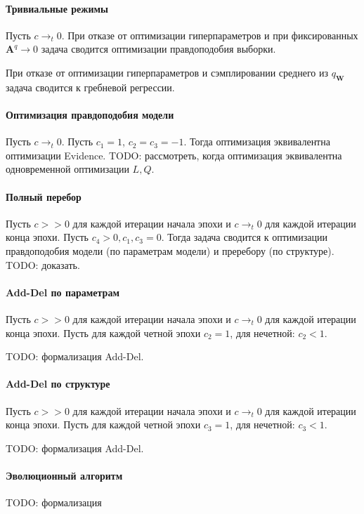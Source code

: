 \documentclass[12pt]{article}
\begin{document}
\paragraph{Тривиальные режимы}
Пусть $c \to_t 0.$
При отказе от оптимизации гиперпараметров и при фиксированных $\mathbf{A}^q \to 0$ задача сводится оптимизации правдоподобия выборки. 

При отказе от оптимизации гиперпараметров и сэмплировании среднего из $q_\mathbf{W}$ задача сводится к гребневой регрессии.

\paragraph{Оптимизация правдоподобия модели}
Пусть $c \to_t 0.$
Пусть $c_1 = 1$, $c_2 = c_3 = -1$. Тогда оптимизация эквивалентна оптимизации Evidence. 
TODO: рассмотреть, когда оптимизация эквивалентна одновременной оптимизации $L,Q$.

\paragraph{Полный перебор}
Пусть $c >> 0$ для каждой итерации начала эпохи и $c \to_t 0$ для каждой итерации конца эпохи.
Пусть $c_4 > 0, c_1,c_3 = 0.$ Тогда задача сводится к оптимизации правдоподобия модели (по параметрам модели) и преребору (по структуре).
TODO: доказать.

\paragraph{Add-Del по параметрам}
Пусть $c>> 0$ для каждой итерации начала эпохи и $c \to_t 0$ для каждой итерации конца эпохи.
Пусть для каждой четной эпохи $c_2 = 1$, для нечетной: $c_2 < 1$.

TODO: формализация Add-Del.


\paragraph{Add-Del по структуре}
Пусть $c  >> 0$ для каждой итерации начала эпохи и $c \to_t 0$ для каждой итерации конца эпохи.
Пусть для каждой четной эпохи $c_3 = 1$, для нечетной: $c_3 < 1$.

TODO: формализация Add-Del.

 
\paragraph{Эволюционный алгоритм}
TODO: формализация
\end{document}
